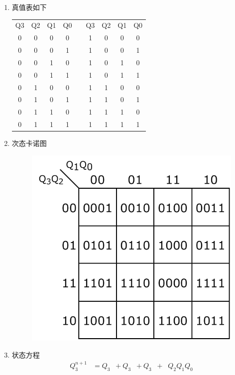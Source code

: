 \documentclass[11pt,UTF8]{ctexart}
\newcommand{\ol}[1]{\mathop{\overline{#1}}}%
\begin{document}
\begin{enumerate}
    \item 真值表如下
\begin{table}[H]
  \centering
    \begin{tabular}{|c|c|c|c|r|c|c|c|c|}
\cline{1-4}\cline{6-9}    Q3    & Q2    & Q1    & Q0    &       & Q3    & Q2    & Q1    & Q0 \bigstrut\\
\cline{1-4}\cline{6-9}    0     & 0     & 0     & 0     &       & 1     & 0     & 0     & 0 \bigstrut\\
\cline{1-4}\cline{6-9}    0     & 0     & 0     & 1     &       & 1     & 0     & 0     & 1 \bigstrut\\
\cline{1-4}\cline{6-9}    0     & 0     & 1     & 0     &       & 1     & 0     & 1     & 0 \bigstrut\\
\cline{1-4}\cline{6-9}    0     & 0     & 1     & 1     &       & 1     & 0     & 1     & 1 \bigstrut\\
\cline{1-4}\cline{6-9}    0     & 1     & 0     & 0     &       & 1     & 1     & 0     & 0 \bigstrut\\
\cline{1-4}\cline{6-9}    0     & 1     & 0     & 1     &       & 1     & 1     & 0     & 1 \bigstrut\\
\cline{1-4}\cline{6-9}    0     & 1     & 1     & 0     &       & 1     & 1     & 1     & 0 \bigstrut\\
\cline{1-4}\cline{6-9}    0     & 1     & 1     & 1     &       & 1     & 1     & 1     & 1 \bigstrut\\
\cline{1-4}\cline{6-9}    \end{tabular}%
\end{table}%
    \item 次态卡诺图
    \begin{figure}[H]
        \centering
        \includegraphics[width=0.4\linewidth]{fig/Karnaugh_additon.pdf}
    \end{figure}
    \item 状态方程
    \[\begin{aligned}
    Q_3^{n+1}&=Q_3\ol{Q_2}+Q_3\ol{Q_1}+Q_3\ol{Q_0}+\ol{Q_3}Q_2Q_1Q_0\\

\end{aligned}\]
\end{enumerate}
\end{document}
